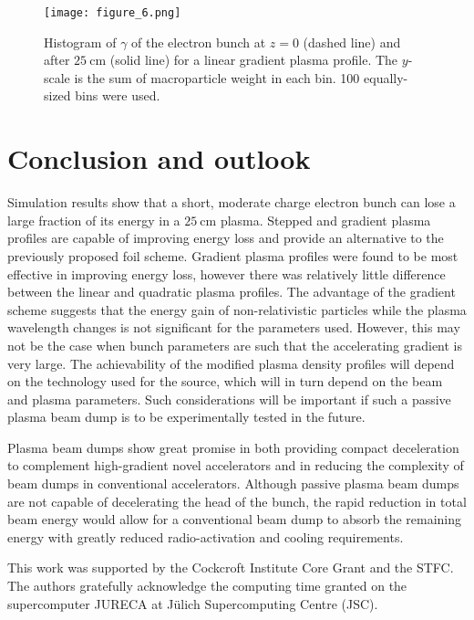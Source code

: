 \documentclass[aip,pop,preprint,superscriptaddress]{revtex4-1}
\begin{document}
\begin{figure}[htb]
  \centering
  \texttt{[image: figure\_6.png]}
  \label{spectrum_gradient}
  \caption{Histogram of $\gamma$ of the electron bunch at $z=0$ (dashed line) and after $25{\mathrm{\ cm}}$ (solid line) for a linear gradient plasma profile. The $y$-scale is the sum of macroparticle weight in each bin. 100 equally-sized bins were used.}
  \label{gradient_energy_spectrum}
\end{figure}

\section{Conclusion and outlook}
\label{sec:conclusion}
Simulation results show that a short, moderate charge electron bunch can lose a large fraction of its energy in a $25\mathrm{\ cm}$ plasma. Stepped and gradient plasma profiles are capable of improving energy loss and provide an alternative to the previously proposed foil scheme. Gradient plasma profiles were found to be most effective in improving energy loss, however there was relatively little difference between the linear and quadratic plasma profiles. The advantage of the gradient scheme suggests that the energy gain of non-relativistic particles while the plasma wavelength changes is not significant for the parameters used. However, this may not be the case when bunch parameters are such that the accelerating gradient is very large. The achievability of the modified plasma density profiles will depend on the technology used for the source, which will in turn depend on the beam and plasma parameters. Such considerations will be important if such a passive plasma beam dump is to be experimentally tested in the future.

Plasma beam dumps show great promise in both providing compact deceleration to complement high-gradient novel accelerators and in reducing the complexity of beam dumps in conventional accelerators. Although passive plasma beam dumps are not capable of decelerating the head of the bunch, the rapid reduction in total beam energy would allow for a conventional beam dump to absorb the remaining energy with greatly reduced radio-activation and cooling requirements.

\begin{acknowledgments}
  This work was supported by the Cockcroft Institute Core Grant and the STFC.
  The authors gratefully acknowledge the computing time granted on the supercomputer JURECA at J\"ulich Supercomputing Centre (JSC).
\end{acknowledgments}


\end{document}
